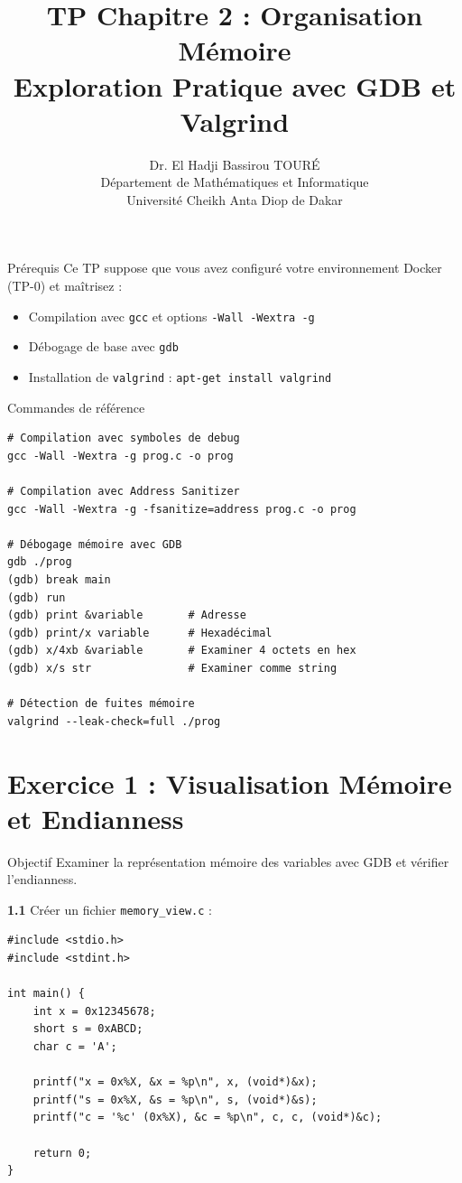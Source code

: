 \documentclass[10pt,a4paper]{article}
\title{\textbf{TP Chapitre 2 : Organisation Mémoire}\\
\large Exploration Pratique avec GDB et Valgrind}
\author{Dr. El Hadji Bassirou TOURÉ\\
Département de Mathématiques et Informatique\\
Université Cheikh Anta Diop de Dakar}
\date{}
\begin{document}
\maketitle

\begin{infobox}{Prérequis}
Ce TP suppose que vous avez configuré votre environnement Docker (TP-0) et maîtrisez :
\begin{itemize}
    \item Compilation avec \texttt{gcc} et options \texttt{-Wall -Wextra -g}
    \item Débogage de base avec \texttt{gdb}
    \item Installation de \texttt{valgrind} : \texttt{apt-get install valgrind}
\end{itemize}
\end{infobox}

\begin{infobox}{Commandes de référence}
\begin{verbatim}
# Compilation avec symboles de debug
gcc -Wall -Wextra -g prog.c -o prog

# Compilation avec Address Sanitizer
gcc -Wall -Wextra -g -fsanitize=address prog.c -o prog

# Débogage mémoire avec GDB
gdb ./prog
(gdb) break main
(gdb) run
(gdb) print &variable       # Adresse
(gdb) print/x variable      # Hexadécimal
(gdb) x/4xb &variable       # Examiner 4 octets en hex
(gdb) x/s str               # Examiner comme string

# Détection de fuites mémoire
valgrind --leak-check=full ./prog
\end{verbatim}
\end{infobox}

\section{Exercice 1 : Visualisation Mémoire et Endianness}

\begin{exercicebox}{Objectif}
Examiner la représentation mémoire des variables avec GDB et vérifier l'endianness.
\end{exercicebox}

\textbf{1.1} Créer un fichier \texttt{memory\_view.c} :

\begin{lstlisting}
#include <stdio.h>
#include <stdint.h>

int main() {
    int x = 0x12345678;
    short s = 0xABCD;
    char c = 'A';
    
    printf("x = 0x%X, &x = %p\n", x, (void*)&x);
    printf("s = 0x%X, &s = %p\n", s, (void*)&s);
    printf("c = '%c' (0x%X), &c = %p\n", c, c, (void*)&c);
    
    return 0;
}
\end{lstlisting}
\end{document}
